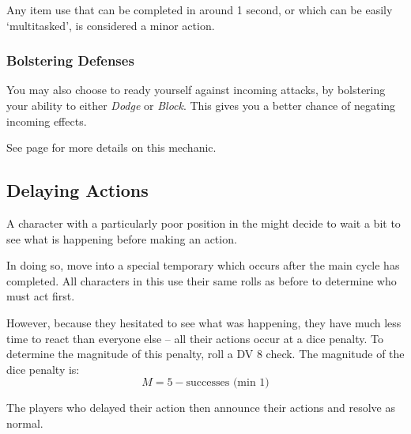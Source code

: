 Any item use that can be completed in around 1 second, or which can be easily `multitasked', is considered a minor action. 

\subsubsection{Bolstering Defenses}
 
 You may also choose to ready yourself against incoming attacks, by bolstering your ability to either {\it Dodge} or {\it Block}. This gives you a better chance of negating incoming effects.  

See page \pageref{S:Accuracy} for more details on this mechanic. 





\subsection{Delaying Actions}

A character with a particularly poor position in the  might decide to wait a bit to see what is happening before making an action. 

In doing so, move into a special temporary  which occurs after the main cycle has completed. All characters in this  use their same rolls as before to determine who must act first.

However, because they hesitated to see what was happening, they have much less time to react than everyone else -- all their actions occur at a dice penalty. To determine the magnitude of this penalty, roll a DV 8  check. The magnitude of the dice penalty is:
$$ M = 5 - \text{successes   (min 1)} $$

The players who delayed their action then announce their actions and resolve as normal. 


